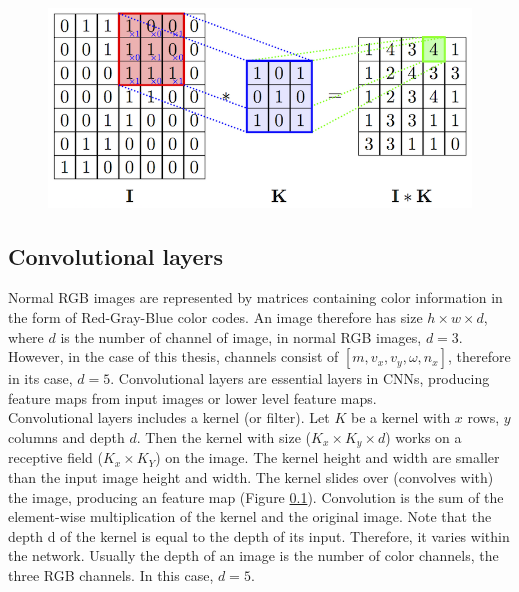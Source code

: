     \begin{figure}[!h]
        \centering
        \includegraphics[]{Figures/convolve.png}
        \caption{}
        \label{}
    \end{figure}

    \subsection{Convolutional layers}
    Normal RGB images are represented by matrices containing color information in the form of Red-Gray-Blue color codes. An image therefore has size $h\times w \times d$, where $d$ is the number of channel of image, in normal RGB images, $d=3$. However, in the case of this thesis, channels consist of $[m, v_x, v_y, \omega, n_x]$, therefore in its case, $d=5$. Convolutional layers are essential layers in CNNs, producing feature maps from input images or lower level feature maps. \\

    Convolutional layers includes a kernel (or filter). Let $K$ be a kernel with $x$ rows, $y$ columns and depth $d$. Then the kernel with size ($K_x \times K_y \times d$) works on a receptive field ($K_x \times K_Y$) on the image. The kernel height and width are smaller than the input image height and width. The kernel slides over (convolves with) the image, producing an feature map (Figure \ref{}). Convolution is the sum of the element-wise multiplication of the kernel and the original image. Note that the depth d of the kernel is equal to the depth of its input. Therefore, it varies within the network. Usually the depth of an image is the number of color channels, the three RGB channels. In this case, $d=5$. \\

